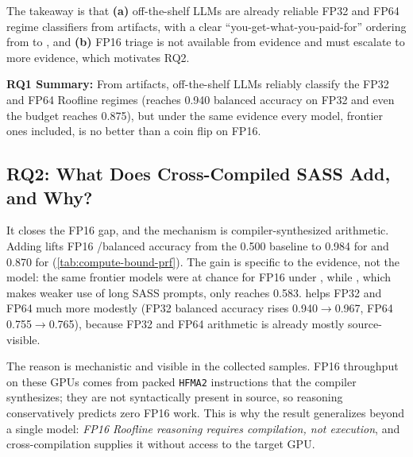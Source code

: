 The takeaway is that \textbf{(a)} off-the-shelf LLMs are already reliable FP32 and FP64 regime classifiers from \sourceonly artifacts, with a clear ``you-get-what-you-paid-for'' ordering from \gptoss to \opus, and \textbf{(b)} FP16 triage is not available from \sourceonly evidence and must escalate to more evidence, which motivates RQ2.

\begin{rqsummary}
\textbf{RQ1 Summary:} From \sourceonly artifacts, off-the-shelf LLMs reliably classify the FP32 and FP64 Roofline regimes (\opus reaches 0.940 balanced accuracy on FP32 and even the budget \gptoss reaches 0.875), but under the same \sourceonly evidence every model, frontier ones included, is no better than a coin flip on FP16.
\end{rqsummary}






\subsection{RQ2: What Does Cross-Compiled SASS Add, and Why?}

It closes the FP16 gap, and the mechanism is compiler-synthesized arithmetic.
Adding \sourcesass lifts FP16 \bandwidthbound/\computebound balanced accuracy from the 0.500 \sourceonly baseline to 0.984 for \opus and 0.870 for \gptfivefour (\autoref{tab:compute-bound-prf}).
The gain is specific to the evidence, not the model: the same frontier models were at chance for FP16 under \sourceonly, while \gptoss, which makes weaker use of long SASS prompts, only reaches 0.583.
\sourcesass helps FP32 and FP64 much more modestly (\opus FP32 balanced accuracy rises 0.940$\rightarrow$0.967, FP64 0.755$\rightarrow$0.765), because FP32 and FP64 arithmetic is already mostly source-visible.

The reason is mechanistic and visible in the collected samples.
FP16 throughput on these GPUs comes from packed \texttt{HFMA2} instructions that the compiler synthesizes; they are not syntactically present in source, so \sourceonly reasoning conservatively predicts zero FP16 work.
This is why the result generalizes beyond a single model: \textit{FP16 Roofline reasoning requires compilation, not execution}, and cross-compilation supplies it without access to the target GPU.

